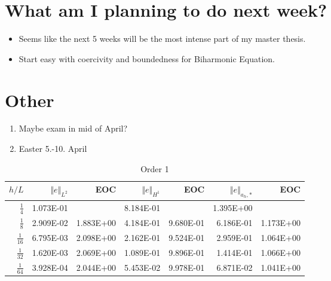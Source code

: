 \documentclass[landscape,a4paper]{article}
\begin{document}
\section*{What am I planning to do next week?}%
\begin{itemize}
    \item Seems like the next 5 weeks will be the most intense part of my master thesis.
    \item Start easy with coercivity and boundedness for Biharmonic Equation.
\end{itemize}


\section*{Other}%
\label{sec:other}
\begin{enumerate}[label=\arabic*)]
    \item Maybe exam in mid of April?
    \item Easter 5.-10. April
\end{enumerate}

\newpage

\begin{table}[htbp]
  \begin{tabular}{rrrrrrr}
    \hline\hline
    \textbf{$h/{L}$} & \textbf{$\Vert e \Vert_{L^2}$} & \textbf{EOC} & \textbf{$ \Vert e \Vert_{H^1}$} & \textbf{EOC} & \textbf{$\Vert e \Vert_{ a_h,* }$} & \textbf{EOC} \\\hline
    $\frac{1}{4}$ & 1.073E-01 &  & 8.184E-01 &  & 1.395E+00 &  \\
    $\frac{1}{8}$ & 2.909E-02 & 1.883E+00 & 4.184E-01 & 9.680E-01 & 6.186E-01 & 1.173E+00 \\
    $\frac{1}{16}$ & 6.795E-03 & 2.098E+00 & 2.162E-01 & 9.524E-01 & 2.959E-01 & 1.064E+00 \\
    $\frac{1}{32}$ & 1.620E-03 & 2.069E+00 & 1.089E-01 & 9.896E-01 & 1.414E-01 & 1.066E+00 \\
    $\frac{1}{64}$ & 3.928E-04 & 2.044E+00 & 5.453E-02 & 9.978E-01 & 6.871E-02 & 1.041E+00 \\\hline\hline
  \end{tabular}
    \caption{Order 1}
\end{table}
\end{document}
